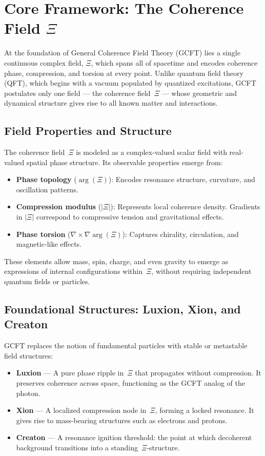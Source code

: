 \section{\texorpdfstring{Core Framework: The Coherence Field $\Xi$}{Core Framework: The Coherence Field Xi}}


At the foundation of General Coherence Field Theory (GCFT) lies a single continuous complex field, $\Xi$, which spans all of spacetime and encodes coherence phase, compression, and torsion at every point. Unlike quantum field theory (QFT), which begins with a vacuum populated by quantized excitations, GCFT postulates only one field — the coherence field~$\Xi$ — whose geometric and dynamical structure gives rise to all known matter and interactions.

\subsection{Field Properties and Structure}

The coherence field~$\Xi$ is modeled as a complex-valued scalar field with real-valued spatial phase structure. Its observable properties emerge from:

\begin{itemize}
    \item \textbf{Phase topology} ($\arg(\Xi)$): Encodes resonance structure, curvature, and oscillation patterns.
    \item \textbf{Compression modulus} ($|\Xi|$): Represents local coherence density. Gradients in $|\Xi|$ correspond to compressive tension and gravitational effects.
    \item \textbf{Phase torsion} ($\nabla \times \nabla \arg(\Xi)$): Captures chirality, circulation, and magnetic-like effects.
\end{itemize}

These elements allow mass, spin, charge, and even gravity to emerge as expressions of internal configurations within~$\Xi$, without requiring independent quantum fields or particles.

\subsection{Foundational Structures: Luxion, Xion, and Creaton}

GCFT replaces the notion of fundamental particles with stable or metastable field structures:

\begin{itemize}
    \item \textbf{Luxion} — A pure phase ripple in~$\Xi$ that propagates without compression. It preserves coherence across space, functioning as the GCFT analog of the photon.
    \item \textbf{Xion} — A localized compression node in~$\Xi$, forming a locked resonance. It gives rise to mass-bearing structures such as electrons and protons.
    \item \textbf{Creaton} — A resonance ignition threshold: the point at which decoherent background transitions into a standing~$\Xi$-structure.
\end{itemize}

